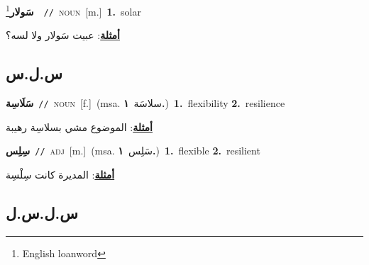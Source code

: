 \documentclass[10pt,a4paper,twoside]{article} %
\begin{document}
\begin{multicols}{2}
{\setlength\topsep{0pt}\textbf{\foreignlanguage{arabic}{سَولار}}\footnote{English loanword}\ \ {\color{gray}\texttt{//}\color{black}}\ \textsc{noun}\ [m.]\ \textbf{1.}~solar\  \begin{flushright}\color{gray}\foreignlanguage{arabic}{\textbf{\underline{\foreignlanguage{arabic}{أمثلة}}}: عبيت سَولار ولا لسه؟}\end{flushright}\color{black}} \vspace{2mm}

\vspace{-3mm}
\subsection*{\color{blue}\foreignlanguage{arabic}{س.ل.س}\color{blue}{}} 

{\setlength\topsep{0pt}\textbf{\foreignlanguage{arabic}{سَلَاسِة}}\ {\color{gray}\texttt{//}\color{black}}\ \textsc{noun}\ [f.]\ \color{gray}(msa. \foreignlanguage{arabic}{سلاسَة}~\foreignlanguage{arabic}{\textbf{١.}})\color{black}\ \textbf{1.}~flexibility  \textbf{2.}~resilience\  \begin{flushright}\color{gray}\foreignlanguage{arabic}{\textbf{\underline{\foreignlanguage{arabic}{أمثلة}}}: الموضوع مشي بسلاسِة رهيبة}\end{flushright}\color{black}} \vspace{2mm}

{\setlength\topsep{0pt}\textbf{\foreignlanguage{arabic}{سِلِس}}\ {\color{gray}\texttt{//}\color{black}}\ \textsc{adj}\ [m.]\ \color{gray}(msa. \foreignlanguage{arabic}{سَلِس}~\foreignlanguage{arabic}{\textbf{١.}})\color{black}\ \textbf{1.}~flexible  \textbf{2.}~resilient\  \begin{flushright}\color{gray}\foreignlanguage{arabic}{\textbf{\underline{\foreignlanguage{arabic}{أمثلة}}}: المديرة كانت سِلْسِة}\end{flushright}\color{black}} \vspace{2mm}

\vspace{-3mm}
\subsection*{\color{blue}\foreignlanguage{arabic}{س.ل.س.ل}\color{blue}{}} 


\end{multicols}
\end{document}
